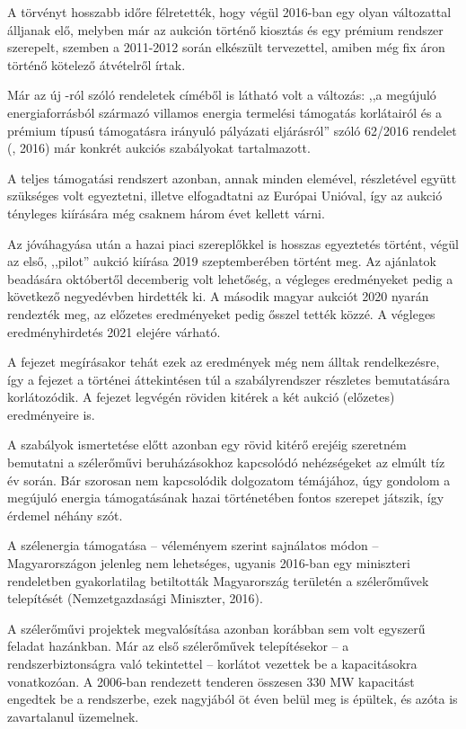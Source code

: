 \documentclass[twoside, magyar, showtrims]{corvinusphd}
\begin{document}
A törvényt hosszabb időre félretették,
hogy végül 2016-ban egy olyan változattal álljanak elő,
melyben már az aukción történő kiosztás
és egy prémium rendszer szerepelt, szemben a 2011-2012
során elkészült tervezettel, amiben még fix áron történő
kötelező átvételről írtak.

Már az új -ról szóló rendeletek
címéből is látható volt a változás:
,,a megújuló energiaforrásból származó
villamos energia termelési támogatás
korlátairól és a prémium típusú támogatásra
irányuló pályázati eljárásról'' szóló 
62/2016  rendelet (, 2016)
már konkrét aukciós szabályokat tartalmazott.

A teljes támogatási rendszert azonban,
annak minden elemével, részletével együtt
szükséges volt egyeztetni, illetve elfogadtatni
az Európai Unióval, így az aukció tényleges
kiírására még csaknem három évet kellett várni.

Az  jóváhagyása után a hazai
piaci szereplőkkel is hosszas egyeztetés
történt, végül az első, ,,pilot'' aukció kiírása
2019 szeptemberében történt meg.
Az ajánlatok beadására októbertől
decemberig volt lehetőség, a
végleges eredményeket pedig a következő negyedévben
hirdették ki. A második magyar aukciót
2020 nyarán rendezték meg, 
az előzetes eredményeket pedig
ősszel tették közzé. A végleges
eredményhirdetés 2021 elejére várható.

A fejezet megírásakor tehát ezek az
eredmények még nem álltak rendelkezésre,
így a fejezet a történei áttekintésen túl a
szabályrendszer részletes bemutatására korlátozódik.
A fejezet legvégén röviden kitérek a két aukció 
(előzetes) eredményeire is.

A szabályok ismertetése előtt azonban
egy rövid kitérő erejéig szeretném bemutatni
a szélerőművi beruházásokhoz kapcsolódó
nehézségeket az elmúlt tíz év során. Bár szorosan
nem kapcsolódik dolgozatom témájához,
úgy gondolom a megújuló energia támogatásának
hazai történetében fontos szerepet
játszik, így érdemel néhány szót.

A szélenergia támogatása -- véleményem szerint
sajnálatos módon -- Magyarországon jelenleg
nem lehetséges, ugyanis 2016-ban egy
miniszteri rendeletben gyakorlatilag
betiltották Magyarország területén a szélerőművek
telepítését (Nemzetgazdasági Miniszter, 2016).

A szélerőművi projektek megvalósítása
azonban korábban sem volt egyszerű
feladat hazánkban. Már az első szélerőművek telepítésekor
-- a rendszerbiztonságra való tekintettel -- 
korlátot vezettek be a kapacitásokra vonatkozóan.
A 2006-ban rendezett tenderen összesen 330 MW
kapacitást engedtek be a rendszerbe, ezek nagyjából öt éven 
belül meg is épültek, és azóta is zavartalanul üzemelnek. 
\end{document}
